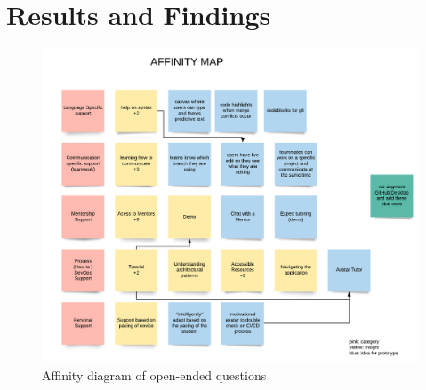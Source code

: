 \documentclass{sigchi}
\begin{document}

\section{Results and Findings}

\begin{figure}[t]
\centering
 \includegraphics[width=0.9\columnwidth]{figures/affinity-diagram.png}
    \caption{Affinity diagram of open-ended questions}\label{fig:affinity}
\end{figure}
\end{document}
